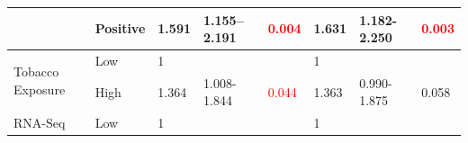 \documentclass[12pt, a4paper]{article}
\begin{document}
\begin{table}[hp]
{\begin{tabular}{|l|l|l|l|l|l|l|l|}
\cline{2-8}
                                        & Positive                                                                            & 1.591                                                                          & 1.155–2.191                                                                   & \textcolor{red}{0.004}                                                        & 1.631                                                                          & 1.182-2.250                                                                   & \textcolor{red}{0.003}                                                         \\ 
\hline
\multirow{2}{*}{Tobacco Exposure}       & {\cellcolor[rgb]{0.62,0.812,0.878}}Low                                              & {\cellcolor[rgb]{0.62,0.812,0.878}}1                                           & {\cellcolor[rgb]{0.62,0.812,0.878}}                                           & {\cellcolor[rgb]{0.62,0.812,0.878}}                                           & {\cellcolor[rgb]{0.62,0.812,0.878}}1                                           & {\cellcolor[rgb]{0.62,0.812,0.878}}                                           & {\cellcolor[rgb]{0.62,0.812,0.878}}                                            \\ 
\cline{2-8}
                                        & High                                                                                & 1.364                                                                          & 1.008-1.844                                                                   & \textcolor{red}{0.044}                                                        & 1.363                                                                          & 0.990-1.875                                                                   & 0.058                                                                          \\ 
\hline
\multirow{2}{*}{RNA-Seq}                & {\cellcolor[rgb]{0.62,0.812,0.878}}Low                                              & {\cellcolor[rgb]{0.62,0.812,0.878}}1                                           & {\cellcolor[rgb]{0.62,0.812,0.878}}                                           & {\cellcolor[rgb]{0.62,0.812,0.878}}                                           & {\cellcolor[rgb]{0.62,0.812,0.878}}1                                           & {\cellcolor[rgb]{0.62,0.812,0.878}}                                           & {\cellcolor[rgb]{0.62,0.812,0.878}}                                            \\ 

\end{tabular}}
\end{table}
\end{document}
